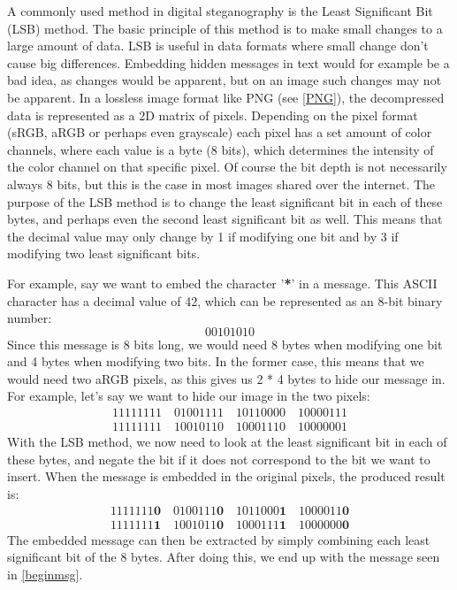 A commonly used method in digital steganography is the Least Significant Bit (LSB) method. The basic principle of this method is to make small changes to a large amount of data. LSB is useful in data formats where small change don't cause big differences. Embedding hidden messages in text would for example be a bad idea, as changes would be apparent, but on an image such changes may not be apparent. In a lossless image format like PNG (see \autoref{PNG}), the decompressed data is represented as a 2D matrix of pixels. Depending on the pixel format (sRGB, aRGB or perhaps even grayscale) each pixel has a set amount of color channels, where each value is a byte (8 bits), which determines the intensity of the color channel on that specific pixel. Of course the bit depth is not necessarily always 8 bits, but this is the case in most images shared over the internet. The purpose of the LSB method is to change the least significant bit in each of these bytes, and perhaps even the second least significant bit as well. This means that the decimal value may only change by 1 if modifying one bit and by 3 if modifying two least significant bits.

For example, say we want to embed the character '\textbf{*}' in a message. This ASCII character has a decimal value of 42, which can be represented as an 8-bit binary number:
\begin{equation}
00101010\label{beginmsg}
\end{equation}
Since this message is 8 bits long, we would need 8 bytes when modifying one bit and 4 bytes when modifying two bits. In the former case, this means that we would need two aRGB pixels, as this gives us 2 * 4 bytes to hide our message in. For example, let's say we want to hide our image in the two pixels:
\begin{equation}
\begin{split}
11111111\quad01001111\quad10110000\quad10000111\\
11111111\quad10010110\quad10001110\quad10000001 
\end{split}
\end{equation}
With the LSB method, we now need to look at the least significant bit in each of these bytes, and negate the bit if it does not correspond to the bit we want to insert. When the message is embedded in the original pixels, the produced result is:
\begin{equation}
\begin{split}
1111111\textbf{0}\quad0100111\textbf{0}\quad1011000\textbf{1}\quad1000011\textbf{0}\\
1111111\textbf{1}\quad1001011\textbf{0}\quad1000111\textbf{1}\quad1000000\textbf{0} 
\end{split}
\end{equation}
The embedded message can then be extracted by simply combining each least significant bit of the 8 bytes. After doing this, we end up with the message seen in \autoref{beginmsg}.

